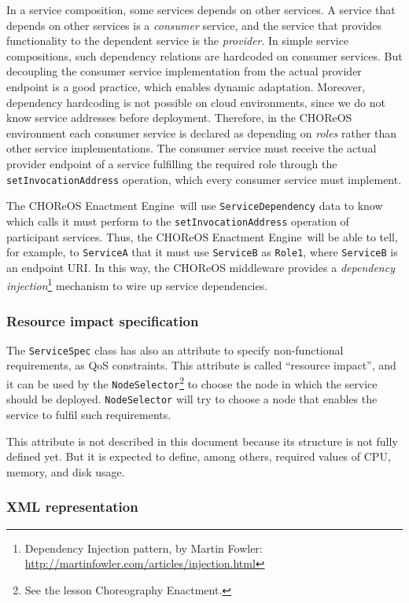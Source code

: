 \documentclass[a4paper, 10pt]{article}
\newcommand{\ee}{CHOReOS Enactment Engine}
\begin{document}
In a service composition, some services depends on other services. A service that depends on other services is a \emph{consumer} service, and the service that provides functionality to the dependent service is the \emph{provider}. In simple service compositions, such dependency relations are hardcoded on consumer services. But decoupling the consumer service implementation from the actual provider endpoint is a good practice, which enables dynamic adaptation. Moreover, dependency hardcoding is not possible on cloud environments, since we do not know service addresses before deployment. Therefore, in the CHOReOS environment each consumer service is declared as depending on \emph{roles} rather than other service implementations. The consumer service must receive the actual provider endpoint of a service fulfilling the required role through the \verb!setInvocationAddress! operation, which every consumer service must implement.  

The \ee\ will use \verb!ServiceDependency! data to know which calls it must perform to the  \verb!setInvocationAddress! operation of participant services. Thus, the \ee\ will be able to tell, for example, to \verb!ServiceA! that it must use \verb!ServiceB! as \verb!Role1!, where \verb!ServiceB! is an endpoint URI. In this way, the CHOReOS middleware provides a \emph{dependency injection}\footnote{Dependency Injection pattern, by Martin Fowler: \url{http://martinfowler.com/articles/injection.html}} mechanism to wire up service dependencies.

\subsubsection*{Resource impact specification}

The \verb!ServiceSpec! class has also an attribute to specify non-functional requirements, as QoS constraints. This attribute is called ``resource impact'', and it can be used by the \verb!NodeSelector!\footnote{See the lesson Choreography Enactment.} to choose the node in which the service should be deployed. \verb!NodeSelector! will try to choose a node that enables the service to fulfil such requirements.

This attribute is not described in this document because its structure is not fully defined yet. But it is expected to define, among others, required values of CPU, memory, and disk usage.

\subsubsection*{XML representation}
\end{document}
